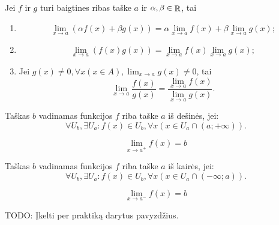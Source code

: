 \begin{prop}
  Jei $f$ ir $g$ turi baigtines ribas taške $a$ ir 
  $\alpha, \beta \in \mathop{\mathbb{R}}$, tai 
  \begin{enumerate}
    \item \[
      \lim_{x \to a} (\alpha f(x) + \beta g(x)) =%
        \alpha \lim_{x \to a} f(x) + \beta \lim_{x \to a} g(x);
      \]
    \item \[
      \lim_{x \to a} (f(x)g(x)) =%
        \lim_{x \to a} f(x) \lim_{x \to a} g(x);
      \]
    \item Jei 
      $g(x) \neq 0, \forall x (x \in A), \lim_{x \to a} g(x) \neq 0$, tai
      \begin{equation*}
        \lim_{x \to a} \frac{f(x)}{g(x)} =
          \frac{\lim_{x \to a} f(x)}{\lim_{x \to a} g(x)}.
      \end{equation*}
  \end{enumerate}
\end{prop}

\begin{defn}
  Taškas $b$ vadinamas funkcijos $f$ riba taške $a$ iš dešinės, jei:
  \[
  \forall U_{b}, \exists U_{a} :%
    f(x) \in U_{b}, \forall x (x \in U_{a} \cap (a; +\infty)).
  \]
  \begin{notation} 
    \[
    \lim_{x \to a^{+}} f(x) = b
    \]
  \end{notation}
\end{defn}

\begin{defn}
  Taškas $b$ vadinamas funkcijos $f$ riba taške $a$ iš kairės, jei:
  \[
  \forall U_{b}, \exists U_{a} :%
    f(x) \in U_{b}, \forall x (x \in U_{a} \cap (-\infty; a)).
  \]
  \begin{notation} 
    \[
    \lim_{x \to a^{-}} f(x) = b
    \]
  \end{notation}
\end{defn}

TODO: Įkelti per praktiką darytus pavyzdžius.

